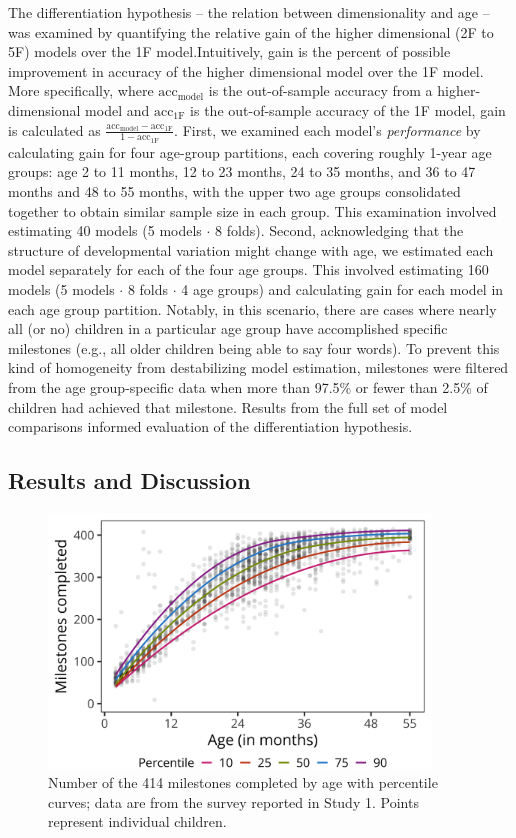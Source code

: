 \documentclass[man, floatsintext]{apa7}
\begin{document}
The differentiation hypothesis -- the relation between dimensionality and age -- was examined by quantifying the relative gain of the higher dimensional (2F to 5F) models over the 1F model.Intuitively, gain is the percent of possible improvement in accuracy of the higher dimensional model over the 1F model. More specifically, 
where $\text{acc}_\text{model}$ is the out-of-sample accuracy from a
higher-dimensional model and $\text{acc}_\text{1F}$ is the
out-of-sample accuracy of the 1F model, gain is calculated as
$\frac{\text{acc}_\text{model} - \text{acc}_\text{1F}}{1 - \text{acc}_\text{1F}}$.
First, we examined each model's \emph{performance} by calculating gain for four age-group partitions, each covering roughly 1-year age groups: age 2 to 11 months, 12 to 23 months, 24 to 35 months, and 36 to 47 months and 48 to 55 months, with the upper two age groups consolidated together to obtain similar sample size in each group. This examination involved estimating 40 models (5 models $\cdot$ 8 folds). Second, acknowledging that the structure of developmental variation might change with age, we estimated each model separately for each of the four age groups. This involved estimating 160 models
(5 models $\cdot$ 8 folds $\cdot$ 4 age groups) and calculating gain for each model in each age group partition. Notably, in this scenario, there are cases where nearly all (or no) children in a particular age group have accomplished specific milestones (e.g., all older children being able to say four words). To prevent this kind of homogeneity from destabilizing model estimation, milestones were filtered from the age group-specific data when more than 97.5\% or fewer than 2.5\% of children had achieved that milestone. Results from the full set of model comparisons informed evaluation of the differentiation hypothesis. 

\subsection{Results and Discussion}

\begin{figure}
\centering
\includegraphics[width=4in]{figures/01_achieve_by_age.png}
\caption{Number of the 414 milestones completed by age with percentile curves; data are from the survey reported in Study 1. Points represent individual children.}
\label{fig:partage}
\end{figure}
\end{document}
